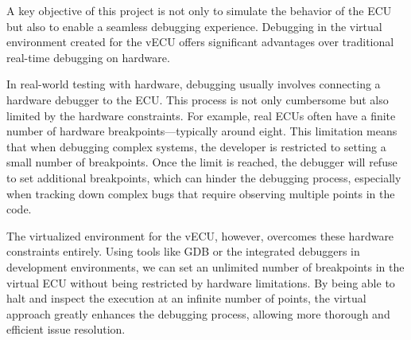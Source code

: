 A key objective of this project is not only to simulate the behavior of the ECU but also to enable a seamless debugging experience. Debugging in the virtual environment created for the vECU offers significant advantages over traditional real-time debugging on hardware.

In real-world testing with hardware, debugging usually involves connecting a hardware debugger to the ECU. This process is not only cumbersome but also limited by the hardware constraints. For example, real ECUs often have a finite number of hardware breakpoints—typically around eight. This limitation means that when debugging complex systems, the developer is restricted to setting a small number of breakpoints. Once the limit is reached, the debugger will refuse to set additional breakpoints, which can hinder the debugging process, especially when tracking down complex bugs that require observing multiple points in the code.

The virtualized environment for the vECU, however, overcomes these hardware constraints entirely. Using tools like GDB or the integrated debuggers in development environments, we can set an unlimited number of breakpoints in the virtual ECU without being restricted by hardware limitations. By being able to halt and inspect the execution at an infinite number of points, the virtual approach greatly enhances the debugging process, allowing more thorough and efficient issue resolution.